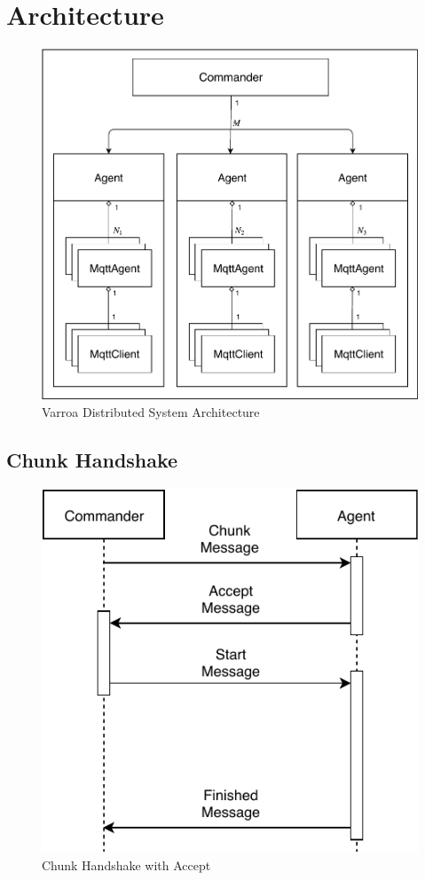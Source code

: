 \chapter{Architecture}
\begin{figure}[h]
	\begin{center}
	\includegraphics[scale=0.75]{Resources/PDF/Architecture}
	\caption{Varroa Distributed System Architecture}
	\label{pic:Architecture}
	\end{center}
\end{figure}
\newpage
\section{Chunk Handshake}
\begin{figure}[h]
	\begin{center}
	\includegraphics[scale=1]{Resources/PDF/ChunkHandshake1}
	\caption{Chunk Handshake with Accept}
	\label{pic:ChunkHandshake1}
	\end{center}
\end{figure}


